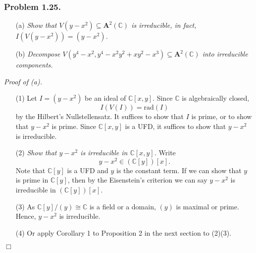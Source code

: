 \documentclass{article}
\begin{document}



\subsubsection*{Problem 1.25.}
\begin{enumerate}
\item[(a)]
  \emph{Show that $V(y - x^2) \subseteq \mathbf{A}^2(\mathbb{C})$ is irreducible,
  in fact, $I(V(y - x^2))=(y - x^2)$.}

\item[(b)]
  \emph{Decompose $V(y^4 - x^2, y^4 - x^2 y^2 + xy^2 - x^3) \subseteq \mathbf{A}^2(\mathbb{C})$
  into irreducible components.} \\
\end{enumerate}



\emph{Proof of (a).}
\begin{enumerate}
\item[(1)]
  Let $I = (y - x^2)$ be an ideal of $\mathbb{C}[x,y]$.
  Since $\mathbb{C}$ is algebraically closed,
  \[
    I(V(I)) = \mathrm{rad}(I)
  \]
  by the Hilbert's Nullstellensatz.
  It suffices to show that $I$ is prime,
  or to show that $y - x^2$ is prime.
  Since $\mathbb{C}[x,y]$ is a UFD, it suffices to show that $y - x^2$ is irreducible.

\item[(2)]
  \emph{Show that $y - x^2$ is irreducible in $\mathbb{C}[x,y]$.}
  Write
  \[
    y - x^2 \in (\mathbb{C}[y])[x].
  \]
  Note that $\mathbb{C}[y]$ is a UFD and $y$ is the constant term.
  If we can show that $y$ is prime in $\mathbb{C}[y]$, then by the Eisenstein's criterion
  we can say $y - x^2$ is irreducible in $(\mathbb{C}[y])[x]$.

\item[(3)]
  As $\mathbb{C}[y]/(y) \cong \mathbb{C}$ is a field or a domain,
  $(y)$ is maximal or prime.
  Hence, $y - x^2$ is irreducible.

\item[(4)]
  Or apply Corollary 1 to Proposition 2 in the next section to (2)(3).
\end{enumerate}
$\Box$ \\
\end{document}
